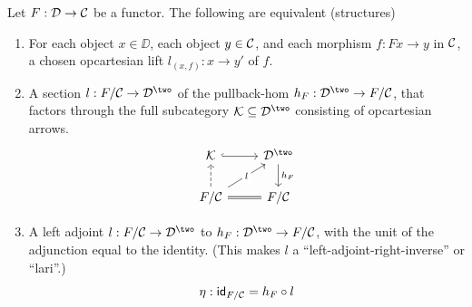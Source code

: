 \begin{proposition}\label{prop:opfibration-equiv-defs}
  Let $F : \mathcal{D} \to \mathcal{C}$ be a functor.
  The following are equivalent (structures)
  \begin{enumerate}
    \item For each object $x \in \DD$, each object $y \in \mathcal{C}$,
    and each morphism $f : F x \to y$ in $\mathcal{C}$,
    a chosen opcartesian lift $l_{(x,f)} : x \to y'$ of $f$.
    \item A section $l : F / \CC \to \DD^\two$
    of the pullback-hom $h_F : \DD^\two \to F / \CC$,
    that factors through the full subcategory
    $\KK \subseteq \DD^\two$ consisting of opcartesian arrows.
    \[ \begin{tikzcd}
      {\KK} & {\DD^\two} \\
      {F / \CC} & {F / \CC}
      \arrow[hook, from=1-1, to=1-2]
      \arrow["{h_F}", from=1-2, to=2-2]
      \arrow[dashed, from=2-1, to=1-1]
      \arrow["l"{description}, from=2-1, to=1-2]
      \arrow[equals, from=2-1, to=2-2]
    \end{tikzcd} \]
    \item A left adjoint $l : F / \CC \to \DD^\two$
    to $h_F : \DD^\two \to F / \CC$,
    with the unit of the adjunction equal to the identity.
    (This makes $l$ a ``left-adjoint-right-inverse'' or ``lari''.)
    \[ \eta : \mathsf{id}_{F / \mathcal{C}} = h_F \circ l \]
  \end{enumerate}
\end{proposition}
